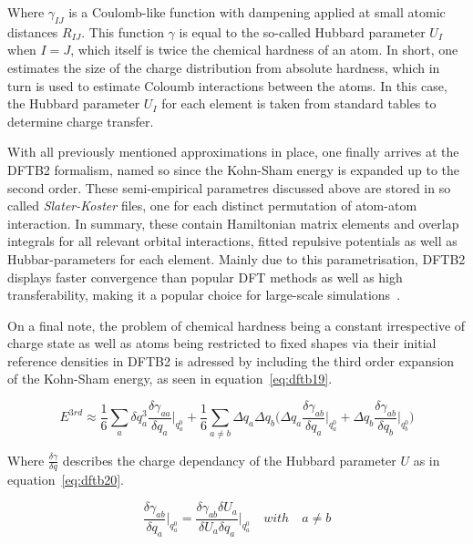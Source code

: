 \documentclass[11pt]{article}
\begin{document}
\noindent Where $\gamma_{IJ}$ is a Coulomb-like function with dampening applied at small atomic distances $R_{IJ}$.
This function $\gamma$ is equal to the so-called Hubbard parameter $U_I$ when $I=J$, which itself is twice the chemical hardness of an atom.
In short, one estimates the size of the charge distribution from absolute hardness, which in turn is used to estimate Coloumb interactions between the atoms.
In this case, the Hubbard parameter $U_I$ for each element is taken from standard tables to determine charge transfer.
\\ \par \noindent 
With all previously mentioned approximations in place, one finally arrives at the DFTB2 formalism, named so since the Kohn-Sham energy is expanded up to the second order. 
These semi-empirical parametres discussed above are stored in so called \textit{Slater-Koster} files, one for each distinct permutation of atom-atom interaction. In summary, these contain Hamiltonian matrix elements and overlap integrals for all relevant orbital interactions, fitted repulsive potentials as well as Hubbar-parameters for each element.
Mainly due to this parametrisation, DFTB2 displays faster convergence than popular DFT methods as well as high transferability, making it a popular choice for large-scale simulations~\cite{Hofer2023}.
\\ \par \noindent
On a final note, the problem of chemical hardness being a constant irrespective of charge state as well as atoms being restricted to fixed shapes via their initial reference densities in DFTB2 is adressed by including the third order expansion of the Kohn-Sham energy, as seen in equation~\ref{eq:dftb19}.

\begin{equation}
  E^{3rd} \approx \frac{1}{6}\sum_{a}^{}\delta q_a^3\frac{\delta\gamma_{aa}}{\delta q_a}\Biggr|_{q_a^0} + \frac{1}{6}\sum_{a \neq b}^{}\Delta q_a \Delta q_b \Biggl( \Delta q_a \frac{\delta \gamma_{ab}}{\delta q_a}\Biggr|_{q_a^0} + \Delta q_b \frac{\delta \gamma_{ab}}{\delta q_b}\Biggr|_{q_b^0} \Biggr)
    \label{eq:dftb19}
\end{equation}

\bigskip

\noindent Where $\frac{\delta\gamma}{\delta q}$ describes the charge dependancy of the Hubbard parameter $U$ as in equation~\ref{eq:dftb20}.

\begin{equation}
  \frac{\delta\gamma_{ab}}{\delta q_a}\Biggr|_{q_a^0} = \frac{\delta\gamma_{ab}\delta U_a}{\delta U_a\delta q_a}\Biggr|_{q_a^0} \quad with \quad a\neq b
  \label{eq:dftb20}
\end{equation}
\end{document}
